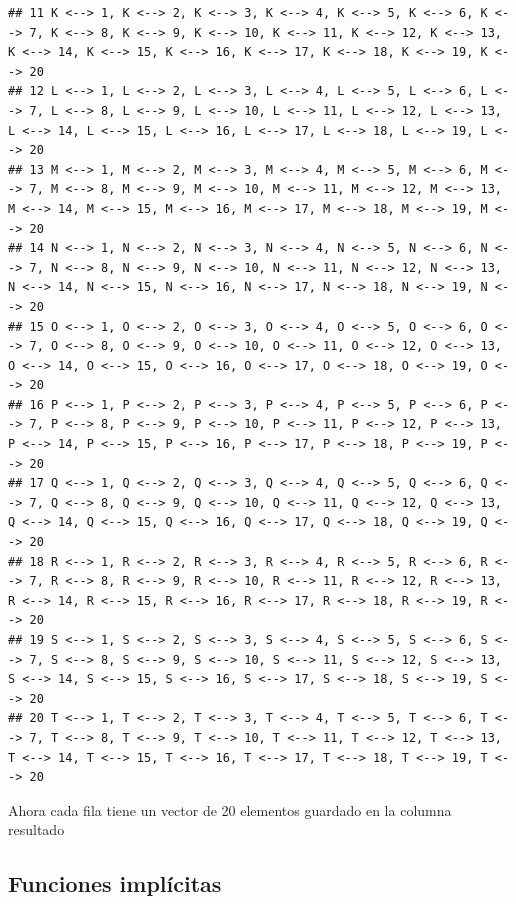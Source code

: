 \documentclass[]{book}
\begin{document}
\begin{verbatim}
## 11 K <--> 1, K <--> 2, K <--> 3, K <--> 4, K <--> 5, K <--> 6, K <--> 7, K <--> 8, K <--> 9, K <--> 10, K <--> 11, K <--> 12, K <--> 13, K <--> 14, K <--> 15, K <--> 16, K <--> 17, K <--> 18, K <--> 19, K <--> 20
## 12 L <--> 1, L <--> 2, L <--> 3, L <--> 4, L <--> 5, L <--> 6, L <--> 7, L <--> 8, L <--> 9, L <--> 10, L <--> 11, L <--> 12, L <--> 13, L <--> 14, L <--> 15, L <--> 16, L <--> 17, L <--> 18, L <--> 19, L <--> 20
## 13 M <--> 1, M <--> 2, M <--> 3, M <--> 4, M <--> 5, M <--> 6, M <--> 7, M <--> 8, M <--> 9, M <--> 10, M <--> 11, M <--> 12, M <--> 13, M <--> 14, M <--> 15, M <--> 16, M <--> 17, M <--> 18, M <--> 19, M <--> 20
## 14 N <--> 1, N <--> 2, N <--> 3, N <--> 4, N <--> 5, N <--> 6, N <--> 7, N <--> 8, N <--> 9, N <--> 10, N <--> 11, N <--> 12, N <--> 13, N <--> 14, N <--> 15, N <--> 16, N <--> 17, N <--> 18, N <--> 19, N <--> 20
## 15 O <--> 1, O <--> 2, O <--> 3, O <--> 4, O <--> 5, O <--> 6, O <--> 7, O <--> 8, O <--> 9, O <--> 10, O <--> 11, O <--> 12, O <--> 13, O <--> 14, O <--> 15, O <--> 16, O <--> 17, O <--> 18, O <--> 19, O <--> 20
## 16 P <--> 1, P <--> 2, P <--> 3, P <--> 4, P <--> 5, P <--> 6, P <--> 7, P <--> 8, P <--> 9, P <--> 10, P <--> 11, P <--> 12, P <--> 13, P <--> 14, P <--> 15, P <--> 16, P <--> 17, P <--> 18, P <--> 19, P <--> 20
## 17 Q <--> 1, Q <--> 2, Q <--> 3, Q <--> 4, Q <--> 5, Q <--> 6, Q <--> 7, Q <--> 8, Q <--> 9, Q <--> 10, Q <--> 11, Q <--> 12, Q <--> 13, Q <--> 14, Q <--> 15, Q <--> 16, Q <--> 17, Q <--> 18, Q <--> 19, Q <--> 20
## 18 R <--> 1, R <--> 2, R <--> 3, R <--> 4, R <--> 5, R <--> 6, R <--> 7, R <--> 8, R <--> 9, R <--> 10, R <--> 11, R <--> 12, R <--> 13, R <--> 14, R <--> 15, R <--> 16, R <--> 17, R <--> 18, R <--> 19, R <--> 20
## 19 S <--> 1, S <--> 2, S <--> 3, S <--> 4, S <--> 5, S <--> 6, S <--> 7, S <--> 8, S <--> 9, S <--> 10, S <--> 11, S <--> 12, S <--> 13, S <--> 14, S <--> 15, S <--> 16, S <--> 17, S <--> 18, S <--> 19, S <--> 20
## 20 T <--> 1, T <--> 2, T <--> 3, T <--> 4, T <--> 5, T <--> 6, T <--> 7, T <--> 8, T <--> 9, T <--> 10, T <--> 11, T <--> 12, T <--> 13, T <--> 14, T <--> 15, T <--> 16, T <--> 17, T <--> 18, T <--> 19, T <--> 20
\end{verbatim}

Ahora cada fila tiene un vector de 20 elementos guardado en la columna resultado

\hypertarget{funciones-implicitas}{%
\subsection{Funciones implícitas}\label{funciones-implicitas}}
\end{document}
